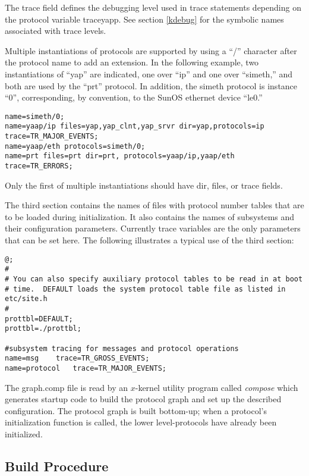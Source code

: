 The {\sanss trace} field defines the debugging level used in trace
statements depending on the protocol variable {\sanss traceyapp}.  See
section \ref{kdebug} for the symbolic names associated with trace levels.

Multiple instantiations of protocols are supported by using a ``/''
character after the protocol name to add an extension.  In the following
example, two instantiations of ``yap'' are indicated, one over ``ip'' and
one over ``simeth,'' and both are used by the ``prt'' protocol.  In
addition, the simeth protocol is instance ``0'', corresponding, by
convention, to the SunOS ethernet device ``le0.''
\let\tt=\COURIERtt
\begin{verbatim}
name=simeth/0;
name=yaap/ip files=yap,yap_clnt,yap_srvr dir=yap,protocols=ip trace=TR_MAJOR_EVENTS;
name=yaap/eth protocols=simeth/0;
name=prt files=prt dir=prt, protocols=yaap/ip,yaap/eth trace=TR_ERRORS;
\end{verbatim}
\let\tt=\CMRtt

\noindent Only the first of multiple instantiations should have {\sanss dir},
{\sanss files}, or {\sanss trace} fields.

The third section contains the names of files with protocol number
tables that are to be loaded during initialization.  It also
contains the names of subsystems and their configuration parameters.
Currently trace variables are the only parameters that can be set
here.  The following illustrates a typical use of the third section:

\let\tt=\COURIERtt
\begin{verbatim}
@;
#
# You can also specify auxiliary protocol tables to be read in at boot
# time.  DEFAULT loads the system protocol table file as listed in etc/site.h
#
prottbl=DEFAULT;
prottbl=./prottbl;

#subsystem tracing for messages and protocol operations
name=msg	trace=TR_GROSS_EVENTS;
name=protocol	trace=TR_MAJOR_EVENTS;
\end{verbatim}
\let\tt=\CMRtt

The graph.comp file is read by an $x$-kernel utility program called
{\em compose} which generates startup code to build the protocol
graph and set up the described configuration.  The protocol graph is
built bottom-up; when a protocol's initialization function is called,
the lower level-protocols have already been initialized.

\subsection{Build Procedure}

